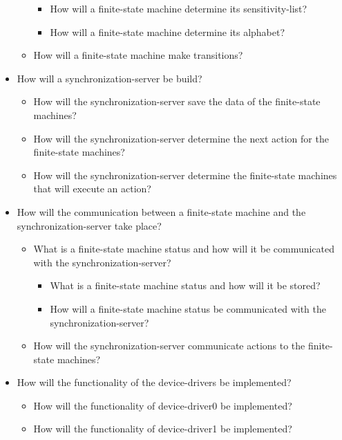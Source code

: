 \begin{itemize}
\begin{itemize}
    \begin{itemize}
    \tightlist
    \item
      How will a finite-state machine determine its sensitivity-list?
    \item
      How will a finite-state machine determine its alphabet?
    \end{itemize}
  \item
    How will a finite-state machine make transitions?
  \end{itemize}
\item
  How will a synchronization-server be build?

  \begin{itemize}
  \tightlist
  \item
    How will the synchronization-server save the data of the
    finite-state machines?
  \item
    How will the synchronization-server determine the next action for
    the finite-state machines?
  \item
    How will the synchronization-server determine the finite-state
    machines that will execute an action?
  \end{itemize}
\item
  How will the communication between a finite-state machine and the
  synchronization-server take place?

  \begin{itemize}
  \tightlist
  \item
    What is a finite-state machine status and how will it be
    communicated with the synchronization-server?

    \begin{itemize}
    \tightlist
    \item
      What is a finite-state machine status and how will it be stored?
    \item
      How will a finite-state machine status be communicated with the
      synchronization-server?
    \end{itemize}
  \item
    How will the synchronization-server communicate actions to the
    finite-state machines?
  \end{itemize}
\item
  How will the functionality of the device-drivers be implemented?

  \begin{itemize}
  \tightlist
  \item
    How will the functionality of device-driver0 be implemented?
  \item
    How will the functionality of device-driver1 be implemented?
  \end{itemize}
\end{itemize}
